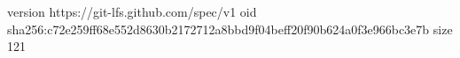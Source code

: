 version https://git-lfs.github.com/spec/v1
oid sha256:c72e259ff68e552d8630b2172712a8bbd9f04beff20f90b624a0f3e966bc3e7b
size 121
